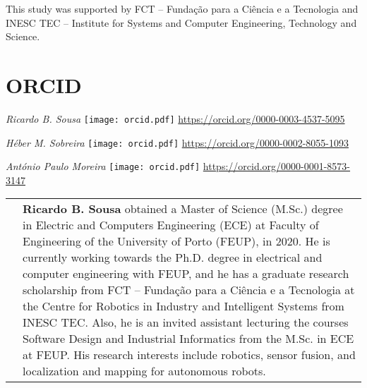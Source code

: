 \documentclass[10pt,a4paper,notitlepage,twocolumn,oneside]{article}
\begin{document}
This study was supported by FCT -- Fundação para a Ciência e a Tecnologia and INESC TEC -- Institute for Systems and Computer Engineering, Technology and Science.

\section*{ORCID}

\noindent \textit{Ricardo B. Sousa} \texttt{[image: orcid.pdf]} \href{https://orcid.org/0000-0003-4537-5095}{https://orcid.org/0000-0003-4537-5095}

\noindent \textit{H\'{e}ber M. Sobreira} \texttt{[image: orcid.pdf]} \href{https://orcid.org/0000-0002-8055-1093}{https://orcid.org/0000-0002-8055-1093}

\noindent \textit{Ant\'{o}nio Paulo Moreira} \texttt{[image: orcid.pdf]} \href{https://orcid.org/0000-0001-8573-3147}{https://orcid.org/0000-0001-8573-3147}




\printbibliography

%
%





\hfill\break

\begin{tabular}{p{} p{}}
\raisebox{-0.925\totalheight}{\texttt{[image: figures/sousa.jpg]}} &
\textbf{Ricardo B. Sousa} obtained a Master of Science (M.Sc.) degree in Electric and Computers Engineering (ECE) at Faculty of Engineering of the University of Porto (FEUP), in 2020.
He is currently working towards the Ph.D. degree in electrical and computer engineering with FEUP, and he has a graduate research scholarship from FCT -- Fundação para a Ciência e a Tecnologia at the Centre for Robotics in Industry and Intelligent Systems from INESC TEC.
Also, he is an invited assistant lecturing the courses Software Design and Industrial Informatics from the M.Sc. in ECE at FEUP.
His research interests include robotics, sensor fusion, and localization and mapping for autonomous robots.\\
\end{tabular}

\end{document}
